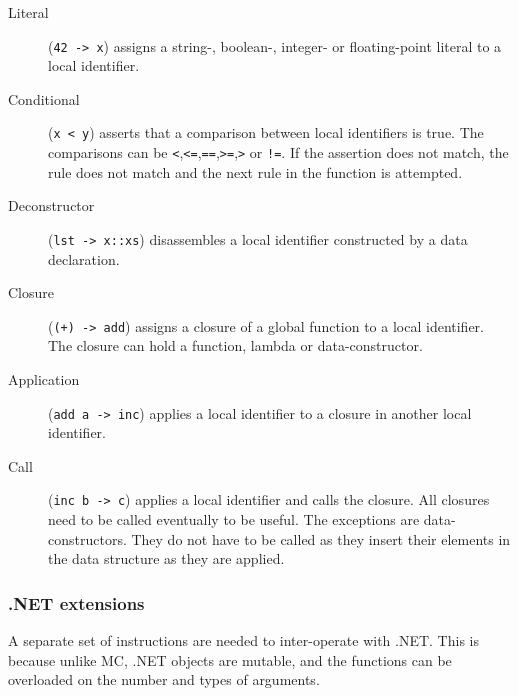 \begin{description}
\item[Literal] (\verb|42 -> x|) assigns a string-, boolean-, integer- or floating-point literal to a local identifier.
\item[Conditional] (\verb|x < y|) asserts that a comparison between local identifiers is true.
    The comparisons can be \verb|<|,\verb|<=|,\verb|==|,\verb|>=|,\verb|>| or \verb|!=|.
    If the assertion does not match, the rule does not match and the next rule in the function is attempted.
\item[Deconstructor] (\verb|lst -> x::xs|) disassembles a local identifier constructed by a data declaration.
\item[Closure] (\verb|(+) -> add|) assigns a closure of a global function to a local identifier.
    The closure can hold a function, lambda or data-constructor.
\item[Application] (\verb|add a -> inc|) applies a local identifier to a closure in another local identifier.
\item[Call] (\verb|inc b -> c|) applies a local identifier and calls the closure.
    All closures need to be called eventually to be useful.
    The exceptions are data-constructors. 
    They do not have to be called as they insert their elements in the data structure as they are applied.
\end{description}

\subsubsection{.NET extensions}
A separate set of instructions are needed to inter-operate with .NET.
This is because unlike MC, .NET objects are mutable, and the functions can be overloaded on the number and types of arguments.

